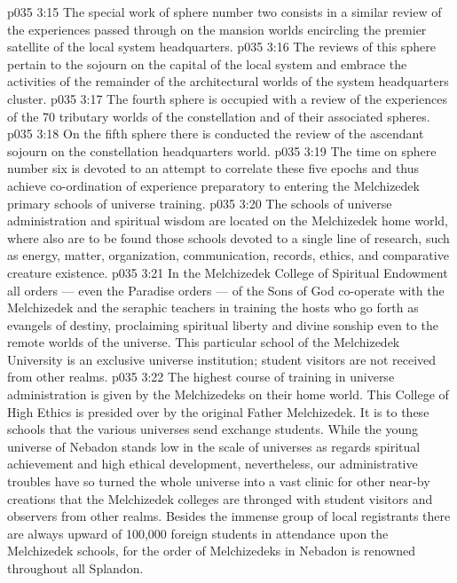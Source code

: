 \vs p035 3:15 \bibnobreakspace The special work of sphere number two consists in a similar review of the experiences passed through on the mansion worlds encircling the premier satellite of the local system headquarters.
\vs p035 3:16 \bibnobreakspace The reviews of this sphere pertain to the sojourn on the capital of the local system and embrace the activities of the remainder of the architectural worlds of the system headquarters cluster.
\vs p035 3:17 \bibnobreakspace The fourth sphere is occupied with a review of the experiences of the 70 tributary worlds of the constellation and of their associated spheres.
\vs p035 3:18 \bibnobreakspace On the fifth sphere there is conducted the review of the ascendant sojourn on the constellation headquarters world.
\vs p035 3:19 \bibnobreakspace The time on sphere number six is devoted to an attempt to correlate these five epochs and thus achieve co\hyp{}ordination of experience preparatory to entering the Melchizedek primary schools of universe training.
\vs p035 3:20 \pc The schools of universe administration and spiritual wisdom are located on the Melchizedek home world, where also are to be found those schools devoted to a single line of research, such as energy, matter, organization, communication, records, ethics, and comparative creature existence.
\vs p035 3:21 In the Melchizedek College of Spiritual Endowment all orders --- even the Paradise orders --- of the Sons of God co\hyp{}operate with the Melchizedek and the seraphic teachers in training the hosts who go forth as evangels of destiny, proclaiming spiritual liberty and divine sonship even to the remote worlds of the universe. This particular school of the Melchizedek University is an exclusive universe institution; student visitors are not received from other realms.
\vs p035 3:22 The highest course of training in universe administration is given by the Melchizedeks on their home world. This College of High Ethics is presided over by the original Father Melchizedek. It is to these schools that the various universes send exchange students. While the young universe of Nebadon stands low in the scale of universes as regards spiritual achievement and high ethical development, nevertheless, our administrative troubles have so turned the whole universe into a vast clinic for other near\hyp{}by creations that the Melchizedek colleges are thronged with student visitors and observers from other realms. Besides the immense group of local registrants there are always upward of 100,000 foreign students in attendance upon the Melchizedek schools, for the order of Melchizedeks in Nebadon is renowned throughout all Splandon.
